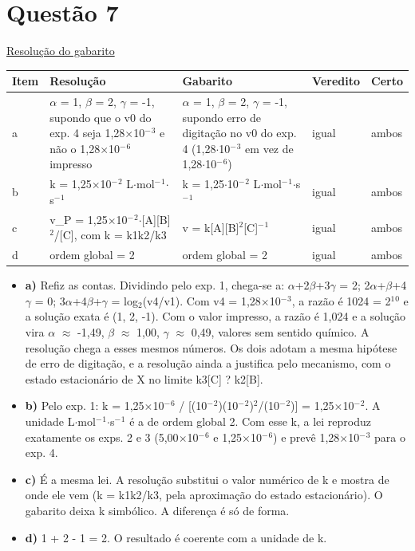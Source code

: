 \documentclass{article}%
\begin{document}
\section*{Questão 7}%
\href{https://poliedroresolve.sistemapoliedro.com.br/vestibulares/ime/2027/ime-2-fase-dia-3-28-10-2026-2-fase-dia-3/dissertativa-7-quimica-2-fase-dia-3-ime-2027}{Resolução do gabarito}\par\smallskip%
\begin{longtable}{@{}p{} p{} p{} p{} p{}@{}}\toprule Item & Resolução & Gabarito & Veredito & Certo \\ \midrule
a & $\alpha$ = 1, $\beta$ = 2, $\gamma$ = -1, supondo que o v0 do exp. 4 seja 1,28$\times$10$^{-}$$^3$ e não o 1,28$\times$10$^{-}$$^{6}$ impresso & $\alpha$ = 1, $\beta$ = 2, $\gamma$ = -1, supondo erro de digitação no v0 do exp. 4 (1,28$\cdot$10$^{-}$$^3$ em vez de 1,28$\cdot$10$^{-}$$^{6}$) & igual & ambos \\
b & k = 1,25$\times$10$^{-}$$^2$ L$\cdot$mol$^{-}$$^{1}$$\cdot$s$^{-}$$^{1}$ & k = 1,25$\cdot$10$^{-}$$^2$ L$\cdot$mol$^{-}$$^{1}$$\cdot$s$^{-}$$^{1}$ & igual & ambos \\
c & v\_P = 1,25$\times$10$^{-}$$^2$$\cdot${[}A{]}{[}B{]}$^2$/{[}C{]}, com k = k1k2/k3 & v = k{[}A{]}{[}B{]}$^2${[}C{]}$^{-}$$^{1}$ & igual & ambos \\
d & ordem global = 2 & ordem global = 2 & igual & ambos \\
\bottomrule\end{longtable}%
\begin{itemize}%
\item%
\textbf{a)} Refiz as contas. Dividindo pelo exp. 1, chega{-}se a: $\alpha$+2$\beta$+3$\gamma$ = 2; 2$\alpha$+$\beta$+4$\gamma$ = 0; 3$\alpha$+4$\beta$+$\gamma$ = log$_{2}$(v4/v1). Com v4 = 1,28$\times$10$^{-}$$^3$, a razão é 1024 = 2$^{1}$$^{0}$ e a solução exata é (1, 2, -1). Com o valor impresso, a razão é 1,024 e a solução vira $\alpha$ $\approx$ -1,49, $\beta$ $\approx$ 1,00, $\gamma$ $\approx$ 0,49, valores sem sentido químico. A resolução chega a esses mesmos números. Os dois adotam a mesma hipótese de erro de digitação, e a resolução ainda a justifica pelo mecanismo, com o estado estacionário de X no limite k3{[}C{]} ? k2{[}B{]}.%
\item%
\textbf{b)} Pelo exp. 1: k = 1,25$\times$10$^{-}$$^{6}$ / {[}(10$^{-}$$^2$)(10$^{-}$$^2$)$^2$/(10$^{-}$$^2$){]} = 1,25$\times$10$^{-}$$^2$. A unidade L$\cdot$mol$^{-}$$^{1}$$\cdot$s$^{-}$$^{1}$ é a de ordem global 2. Com esse k, a lei reproduz exatamente os exps. 2 e 3 (5,00$\times$10$^{-}$$^{6}$ e 1,25$\times$10$^{-}$$^{6}$) e prevê 1,28$\times$10$^{-}$$^3$ para o exp. 4.%
\item%
\textbf{c)} É a mesma lei. A resolução substitui o valor numérico de k e mostra de onde ele vem (k = k1k2/k3, pela aproximação do estado estacionário). O gabarito deixa k simbólico. A diferença é só de forma.%
\item%
\textbf{d)} 1 + 2 - 1 = 2. O resultado é coerente com a unidade de k.%
\end{itemize}%
\end{document}
